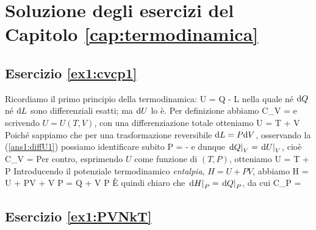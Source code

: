 \chapter{Soluzione degli esercizi del Capitolo \ref{cap:termodinamica}}

%
%
\section*{Esercizio \ref{ex1:cvcp1}}

Ricordiamo il primo principio della termodinamica:
\be
\label{ans1:primo}
\de U = \de Q - \de L
\ee
nella quale né ${\textrm d}Q$ né ${\textrm d}L$ sono differenziali esatti; ma ${\textrm d}U$ lo è. Per definizione abbiamo
\be
C_V = 
\ee
e scrivendo $U = U(T,V)$, con una differenziazione totale otteniamo
\be
\label{ans1:diffU1}
\de U = \de T + \de V
\ee
Poiché sappiamo che per una trasformazione reversibile ${\textrm d}L = P{\textrm d}V$, osservando la (\ref{ans1:diffU1}) possiamo identificare subito
\be
P = -
\ee
e dunque $\left.{\textrm d}Q\right|_V = \left.{\textrm d}U\right|_V$, cioè
\be
C_V = 
\ee
Per contro, esprimendo $U$ come funzione di $(T,P)$, otteniamo
\be
\label{ans1:diffU1}
\de U = \de T + \de P
\ee
Introducendo il potenziale termodinamico {\em entalpia}, $H = U + PV$, abbiamo
\be
\de H = \de U + P\de V + V \de P = \de Q + V \de P
\ee
È quindi chiaro che $\left.{\textrm d}H\right|_P = \left.{\textrm d}Q\right|_P$, da cui
\be
C_P = 
\ee

%
%
\section*{Esercizio \ref{ex1:PVNkT}}

